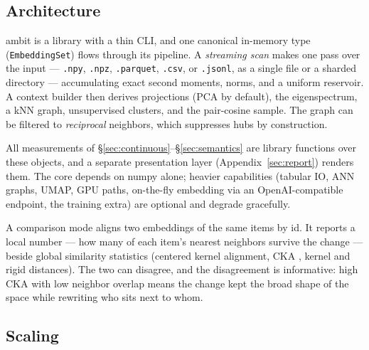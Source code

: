 \documentclass[11pt,letterpaper]{article}
\begin{document}
\subsection{Architecture}

\textsf{ambit} is a library with a thin CLI, and one canonical in-memory
type (\texttt{EmbeddingSet}) flows through its pipeline. A \emph{streaming
scan} makes one pass over the input --- \texttt{.npy}, \texttt{.npz},
\texttt{.parquet}, \texttt{.csv}, or \texttt{.jsonl}, as a single file or
a sharded directory --- accumulating exact second moments, norms, and a
uniform reservoir. A context builder then derives projections (PCA by
default), the eigenspectrum, a kNN graph, unsupervised clusters, and the
pair-cosine sample. The graph can be filtered to \emph{reciprocal}
neighbors, which suppresses hubs by construction.

All measurements of \S\ref{sec:continuous}--\S\ref{sec:semantics} are
library functions over these objects, and a separate presentation layer
(Appendix~\ref{sec:report}) renders them. The core depends on
\textsf{numpy} alone; heavier capabilities (tabular IO, ANN graphs,
UMAP, GPU paths, on-the-fly embedding via an OpenAI-compatible endpoint,
the training extra) are optional and degrade gracefully.

A comparison mode aligns two embeddings of the same items by id. It
reports a local number --- how many of each item's nearest neighbors
survive the change --- beside global similarity statistics (centered
kernel alignment, CKA \cite{kornblith2019}, kernel and rigid distances).
The two can disagree, and the disagreement is informative: high CKA with
low neighbor overlap means the change kept the broad shape of the space
while rewriting who sits next to whom.

\subsection{Scaling}
\end{document}

